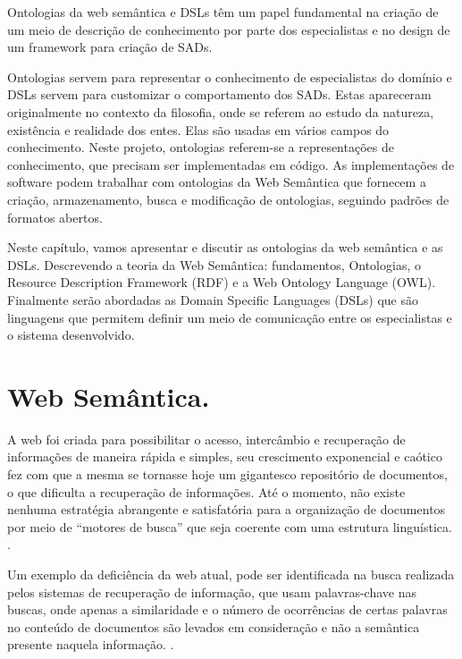 Ontologias da web semântica e \foreignlanguage{english}{DSLs} têm
um papel fundamental na criação de um meio de descrição de conhecimento
por parte dos especialistas e no design de um framework para criação
de SADs. 

Ontologias servem para representar o conhecimento de especialistas
do domínio e DSLs servem para customizar o comportamento dos SADs.
Estas apareceram originalmente no contexto da filosofia, onde se referem
ao estudo da natureza, existência e realidade dos entes. Elas são
usadas em vários campos do conhecimento. Neste projeto, ontologias
referem-se a representações de conhecimento, que precisam ser implementadas
em código. As implementações de software podem trabalhar com ontologias
da Web Semântica que fornecem a criação, armazenamento, busca e modificação
de ontologias, seguindo padrões de formatos abertos. 

Neste capítulo, vamos apresentar e discutir as ontologias da web semântica
e as DSLs. Descrevendo a teoria da Web Semântica: fundamentos, Ontologias,
o \foreignlanguage{english}{Resource Description Framework (RDF})
e a \foreignlanguage{english}{Web Ontology Language} (\foreignlanguage{english}{OWL}).
Finalmente serão abordadas as \foreignlanguage{english}{Domain Specific
Languages (DSLs}) que são linguagens que permitem definir um meio
de comunicação entre os especialistas e o sistema desenvolvido.

\section{Web Semântica.}

A web foi criada para possibilitar o acesso, intercâmbio e recuperação
de informações de maneira rápida e simples, seu crescimento exponencial
e caótico fez com que a mesma se tornasse hoje um gigantesco repositório
de documentos, o que dificulta a recuperação de informações. Até o
momento, não existe nenhuma estratégia abrangente e satisfatória para
a organização de documentos por meio de “motores de busca” que seja
coerente com uma estrutura linguística. \citep{Souza:2004}.

Um exemplo da deficiência da web atual, pode ser identificada na busca
realizada pelos sistemas de recuperação de informação, que usam palavras-chave
nas buscas, onde apenas a similaridade e o número de ocorrências de
certas palavras no conteúdo de documentos são levados em consideração
e não a semântica presente naquela informação. \citep{Souza:2004}.

